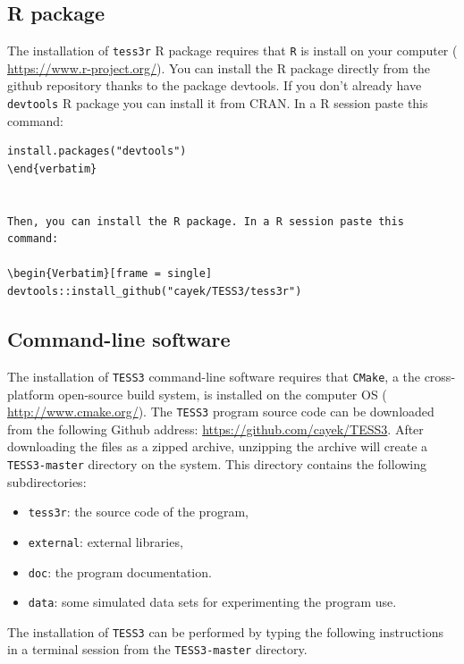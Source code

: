 \documentclass[10pt,a4paper]{article}
\begin{document}
\subsection{R package}
The installation of {\tt tess3r} R package requires that {\tt R} is install on your computer (\url{ 
https://www.r-project.org/}). You can install the R package directly from the github repository thanks to the package devtools. 
If you don't already have {\tt devtools} R package you can install it from CRAN. In a R session paste this command:

\begin{Verbatim}[frame = single]
install.packages("devtools")
\end{verbatim}


Then, you can install the R package. In a R session paste this command:

\begin{Verbatim}[frame = single]
devtools::install_github("cayek/TESS3/tess3r")
\end{Verbatim}

\subsection{Command-line software} 

The installation of {\tt TESS3} command-line software requires that {\tt CMake}, a the cross-platform 
open-source build system, is installed on the computer OS (\url{ 
http://www.cmake.org/}).  The {\tt TESS3}  program source code can be downloaded 
from the following Github address: \url{https://github.com/cayek/TESS3}. After 
downloading the files as a zipped archive, unzipping the archive will create a 
{\tt TESS3-master} directory on the system. This  directory contains the 
following subdirectories:
\begin{itemize}
\item   {\tt tess3r}: the source code of the program,

\item   {\tt external}: external libraries,

\item     {\tt doc}: the program documentation.

\item     {\tt data}: some simulated data sets for experimenting the program 
use.
\end{itemize}
\noindent The installation of {\tt TESS3} can be performed by typing the 
following instructions in a terminal session from the {\tt TESS3-master} 
directory.
\end{document}
